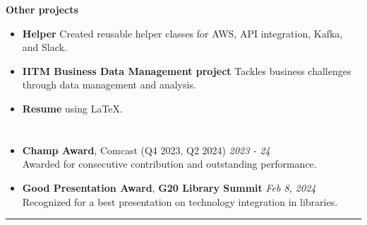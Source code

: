 \documentclass[a4paper,10pt]{article}
\begin{document}
\textbf{Other projects}
\vspace{-2mm}
\begin{itemize}
    \item \textbf{Helper} \href{https://github.com/ShreehariA/helpers}{} Created reusable helper classes for AWS, API integration, Kafka, and Slack.
    \vspace{-2mm}
    \item \textbf{IITM Business Data Management project} \href{https://github.com/ShreehariA/IITM_BDM_Project}{} Tackles business challenges through data management and analysis.
    \vspace{-2mm}
    \item \textbf{Resume} \href{https://github.com/ShreehariA/Resume}{} using LaTeX.
\end{itemize}

\section{\scshape{}}
\begin{itemize}
    \item \textbf{Champ Award}, Comcast (Q4 2023, Q2 2024) \hfill \textit{2023 - 24}\\
    Awarded for consecutive contribution and outstanding performance.
    \vspace{-2mm}
    \item \textbf{Good Presentation Award}, \textbf{G20 Library Summit} \href{https://www.linkedin.com/posts/a-shreehari_ml-huggingface-g20librarysummit-activity-7163032877201371137-ZS8n?utm_source=share&utm_medium=member_desktop}{} \hfill \textit{Feb 8, 2024}\\
    Recognized for a best presentation on technology integration in libraries.
\end{itemize}

\hrule
\end{document}
